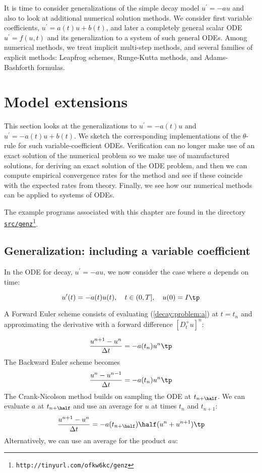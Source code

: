 \documentclass[graybox,sectrefs,envcountresetchap,open=right,final]{svmonodo}
\begin{document}
It is time to consider generalizations of the simple decay model
$u^{\prime}=-au$ and also to look at additional numerical solution
methods.  We consider first variable coefficients, $u^{\prime}=a(t)u +
b(t)$, and later a completely general scalar ODE $u^{\prime}=f(u,t)$
and its generalization to a system of such general ODEs.  Among
numerical methods, we treat implicit multi-step methods, and several
families of explicit methods: Leapfrog schemes, Runge-Kutta methods,
and Adams-Bashforth formulas.

\section{Model extensions}

This section looks at the generalizations to $u^{\prime}=-a(t)u$
and $u^{\prime}=-a(t)u + b(t)$. We sketch the corresponding
implementations of the $\theta$-rule for such variable-coefficient ODEs.
Verification can no longer make use of an exact solution of the
numerical problem so we make use of manufactured solutions,
for deriving an exact solution of the ODE problem, and then we can
compute empirical convergence rates for the method and see if these
coincide with the expected rates from theory.
Finally, we see how our numerical methods can be applied to systems
of ODEs.

The example programs associated with this chapter are found in
the directory \href{{http://tinyurl.com/ofkw6kc/genz}}{\nolinkurl{src/genz}\footnote{\texttt{http://tinyurl.com/ofkw6kc/genz}}}.


\subsection{Generalization: including a variable coefficient}

In the ODE for decay, $u^{\prime}=-au$, we now consider the case where $a$
depends on time:

\begin{equation}
u^{\prime}(t) = -a(t)u(t),\quad t\in (0,T],\quad u(0)=I \tp
\label{decay:problem:a}
\end{equation}

A Forward Euler scheme consists of evaluating (\ref{decay:problem:a})
at $t=t_n$ and approximating the derivative with a forward
difference $[D^+_t u]^n$:

\begin{equation}
\frac{u^{n+1} - u^n}{\Delta t} = -a(t_n)u^n
\tp
\end{equation}
The Backward Euler scheme becomes
\begin{equation}
\frac{u^{n} - u^{n-1}}{\Delta t} = -a(t_n)u^n
\tp
\end{equation}
The Crank-Nicolson method builds on sampling the ODE at
$t_{n+\half}$. We can evaluate $a$ at $t_{n+\half}$
and use an average for $u$ at
times $t_n$ and $t_{n+1}$:
\begin{equation}
\frac{u^{n+1} - u^{n}}{\Delta t} = -a(t_{n+\half})\half(u^n + u^{n+1})
\tp
\end{equation}
Alternatively, we can use an average for the product $au$:
\end{document}
